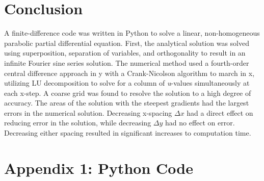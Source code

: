 \documentclass[10pt]{article}
\begin{document}
\section*{Conclusion}
\vspace{-8pt}
A finite-difference code was written in Python to solve a linear, non-homogeneous parabolic partial differential equation. First, the analytical solution was solved using superposition, separation of variables, and orthogonality to result in an infinite Fourier sine series solution. The numerical method used a fourth-order central difference approach in y with a Crank-Nicolson algorithm to march in x, utilizing LU decomposition to solve for a column of \textit{u}-values simultaneously at each x-step. A coarse grid was found to resolve the solution to a high degree of accuracy. The areas of the solution with the steepest gradients had the largest errors in the numerical solution. Decreasing x-spacing $\Delta x$ had a direct effect on reducing error in the solution, while decreasing $\Delta y$ had no effect on error. Decreasing either spacing resulted in significant increases to computation time.


\pagebreak
\section*{Appendix 1: Python Code}

\inputminted{python}{project1.py}

\pagebreak
\end{document}
